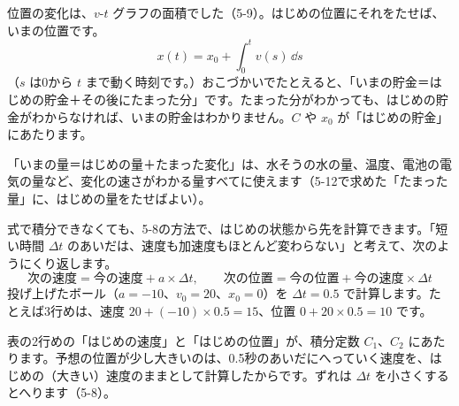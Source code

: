 
\label{bk:5-13:teisekibun}位置の変化は、$v$-$t$ グラフの面積でした（5-9）。はじめの位置にそれをたせば、いまの位置です。
\[ x(t)=x_0+\int_0^t v(s)\,\dd s \]
（$s$ は0から $t$ まで動く時刻です。）おこづかいでたとえると、「いまの貯金＝はじめの貯金＋その後にたまった分」です。たまった分がわかっても、はじめの貯金がわからなければ、いまの貯金はわかりません。$C$ や $x_0$ が「はじめの貯金」にあたります。

「いまの量＝はじめの量＋たまった変化」は、水そうの水の量、温度、電池の電気の量など、変化の速さがわかる量すべてに使えます（5-12で求めた「たまった量」に、はじめの量をたせばよい）。

\begin{bkfigure}
\end{bkfigure}


\label{bk:5-13:hyou}式で積分できなくても、5-8の方法で、はじめの状態から先を計算できます。「短い時間 $\Delta t$ のあいだは、速度も加速度もほとんど変わらない」と考えて、次のようにくり返します。
\[ \text{次の速度}=\text{今の速度}+a\times\Delta t,\qquad \text{次の位置}=\text{今の位置}+\text{今の速度}\times\Delta t \]
投げ上げたボール（$a=-10$、$v_0=20$、$x_0=0$）を $\Delta t=0.5$ で計算します。たとえば3行めは、速度 $20+(-10)\times0.5=15$、位置 $0+20\times0.5=10$ です。
\begin{bkcenter}
\end{bkcenter}
表の2行めの「はじめの速度」と「はじめの位置」が、積分定数 $C_1$、$C_2$ にあたります。予想の位置が少し大きいのは、0.5秒のあいだにへっていく速度を、はじめの（大きい）速度のままとして計算したからです。ずれは $\Delta t$ を小さくするとへります（5-8）。

